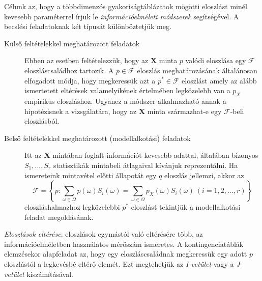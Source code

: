 \documentclass[DIV=15,appendixprefix]{scrreprt}
\theoremstyle{definition}
\theoremstyle{remark}
\begin{document}
Célunk az, hogy a többdimenzós gyakoriságtáblázatok
mögötti eloszlást minél kevesebb paraméterrel írjuk le \emph{információelméleti módszerek}
segítségével. A becslési feladatoknak két típusát különböztetjük meg.
\begin{description}
	\item[Külső feltételekkel meghatározott feladatok] Ebben az esetben feltételezzük, hogy az
	$\mathbf{X}$ minta $p$ valódi eloszlása egy $\mathcal{F}$ eloszláscsaládhoz tartozik. A $p\in
	\mathcal{F}$ eloszlás meghatározásának általánosan elfogadott módja, hogy megkeressük azt a
	$p^* \in \mathcal{F}$ eloszlást amely az alább ismertetett eltérések valamelyikének értelmében
	legközelebb van a $p_X$ empirikus eloszláshoz. Ugyanez a módszer alkalmazható annak a
	hipotézisnek a vizsgálatára, hogy az $\mathbf{X}$ minta származhat-e egy $\mathcal{F}$-beli
	eloszlásból.
	\item[Belső feltételekkel meghatározott (modellalkotási) feladatok] Itt az $\mathbf{X}$ mintában
	foglalt információt kevesebb adattal, általában bizonyos $S_1 , . . . , S_r$ statisztikák
	mintabeli átlagaival kívánjuk reprezentálni. Ha ismereteink mintavétel előtti állapotát egy $q$
	eloszlás jellemzi, akkor az
	\begin{equation*}
		\mathcal{F}=\left\{
		p \colon \sum_{\omega \in \Omega} p\left(\omega\right) S_i\left(\omega\right)=
		\sum_{\omega \in \Omega} p_X\left(\omega\right) S_i\left(\omega\right) \  \left( i=1,{} 2,{} \ldots,{} r \right)
		\right\}
	\end{equation*}
	eloszláshalmazhoz legközelebbi $p^*$ eloszlást tekintjük a modellalkotási feladat megoldásának.
\end{description}
\emph{Eloszlások eltérése}: eloszlások egymástól való eltérésére több, az információelméletben
használatos mérőszám ismeretes. A kontingenciatáblák elemzésekor alapfeladat az, hogy egy
eloszláscsaládnak megkeressük egy adott $p$ eloszlástól a legkevésbé eltérő elemét. Ezt megtehetjük
az \emph{I-vetület} vagy a \emph{J-vetület} kiszámításával.
%
\end{document}
